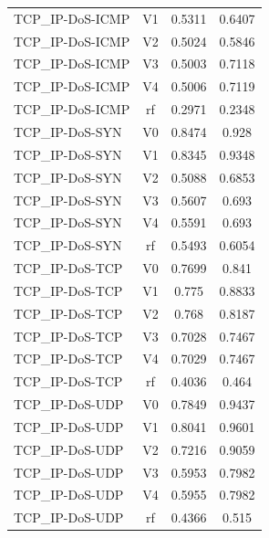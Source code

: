\begin{table}[htbp]
\begin{tabular}{lccc}
TCP\_IP-DoS-ICMP & V1 & 0.5311 & 0.6407 \\
TCP\_IP-DoS-ICMP & V2 & 0.5024 & 0.5846 \\
TCP\_IP-DoS-ICMP & V3 & 0.5003 & 0.7118 \\
TCP\_IP-DoS-ICMP & V4 & 0.5006 & 0.7119 \\
TCP\_IP-DoS-ICMP & rf & 0.2971 & 0.2348 \\
TCP\_IP-DoS-SYN & V0 & 0.8474 & 0.928 \\
TCP\_IP-DoS-SYN & V1 & 0.8345 & 0.9348 \\
TCP\_IP-DoS-SYN & V2 & 0.5088 & 0.6853 \\
TCP\_IP-DoS-SYN & V3 & 0.5607 & 0.693 \\
TCP\_IP-DoS-SYN & V4 & 0.5591 & 0.693 \\
TCP\_IP-DoS-SYN & rf & 0.5493 & 0.6054 \\
TCP\_IP-DoS-TCP & V0 & 0.7699 & 0.841 \\
TCP\_IP-DoS-TCP & V1 & 0.775 & 0.8833 \\
TCP\_IP-DoS-TCP & V2 & 0.768 & 0.8187 \\
TCP\_IP-DoS-TCP & V3 & 0.7028 & 0.7467 \\
TCP\_IP-DoS-TCP & V4 & 0.7029 & 0.7467 \\
TCP\_IP-DoS-TCP & rf & 0.4036 & 0.464 \\
TCP\_IP-DoS-UDP & V0 & 0.7849 & 0.9437 \\
TCP\_IP-DoS-UDP & V1 & 0.8041 & 0.9601 \\
TCP\_IP-DoS-UDP & V2 & 0.7216 & 0.9059 \\
TCP\_IP-DoS-UDP & V3 & 0.5953 & 0.7982 \\
TCP\_IP-DoS-UDP & V4 & 0.5955 & 0.7982 \\
TCP\_IP-DoS-UDP & rf & 0.4366 & 0.515 \\
\bottomrule
\end{tabular}
\end{table}